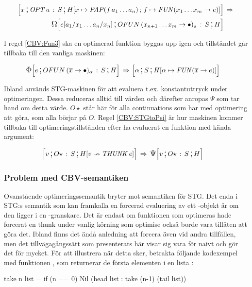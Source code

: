 \documentclass[../Optimise]{subfiles}
\begin{document}
\begin{align}
\mc x{\cOPT aS}{\heapp x{\PAP f{a_{1}\ldots a_{n}}}f{\FUN{x_{1}\ldots x_{m}}e}} & \rulesep\\
\OMEGA{\cOFUN{x_{n+1}\ldots x_{m}}aS}H{e[a_{1}/x_{1}\ldots a_{n}/x_{n}]} \nonumber
\end{align}

 I regel \eqref{CBV:Fun3} ska en optimerad funktion byggas upp igen och tillståndet
 går tillbaka till den vanliga maskinen:

\begin{align}
\label{CBV:Fun3} \IRR{\cOFUN{\many{x}}{\alpha}S}He  \rulesep &\, \mc{\alpha}S{\heap{\alpha}{\FUN{\many{x}}e}}
\end{align}

Ibland används STG-maskinen för att evaluera t.ex. konstantuttryck under optimeringen.
Dessa reduceras alltid till värden och därefter anropas $\Psi$ som tar hand 
om detta värde. $O\star$ står här för alla continuations som har med optimering
att göra, som alla börjar på $O$. Regel \eqref{CBV:STGtoPsi} är hur maskinen kommer 
tillbaka till optimeringstillstånden efter ha evaluerat en funktion med 
kända argument:

\begin{align}
\label{CBV:STGtoPsi} \mc v{O\star\,:\, S}{\nheap v{\THUNK e}} & \rulesep \PSI{O\star\,:\, S}Hv
\end{align}

\subsubsection{Problem med CBV-semantiken}
\label{CBV:Problem}

Ovanstående optimeringssemantik bryter mot semantiken för STG. 
Det enda i STG:s semantik som kan framkalla en forcerad evaluering av ett
-objekt är om den ligger i en -granskare. 
Det är endast om funktionen som optimeras hade forcerat en thunk under vanlig 
körning som optimise också borde vara tillåten att göra det. Ibland finns 
det ändå anledning att forcera även vid andra tillfällen, men det tillvägagångssätt
som presenterats här visar sig vara för naivt och gör det för mycket. För
att illustrera när detta sker, betrakta följande kodexempel med funktionen ,
som returnerar de första  elementen i en lista :

\begin{codeEx}
take n list = if (n == 0) 
                 Nil 
                 (head list : take (n-1) (tail list))
\end{codeEx}
\end{document}

